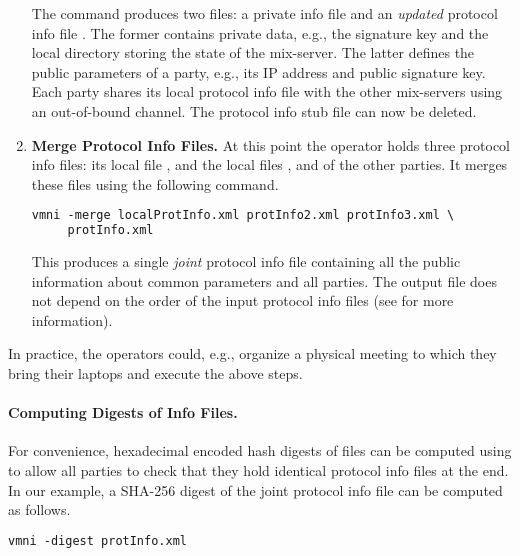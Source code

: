 \documentclass[11pt]{article}
\begin{document}
\begin{enumerate}
  The command produces two files: a private info file
   and an \emph{updated} protocol info file
  . The former contains private data, e.g., the
  signature key and the local directory storing the state of the
  mix-server. The latter defines the public parameters of a party, e.g.,
  its IP address and public signature key. Each party shares its local
  protocol info file with the other mix-servers using an out-of-bound
  channel. The protocol info stub file  can now be
  deleted.

\item\textbf{Merge Protocol Info Files.}  At this point the operator
  holds three protocol info files: its local file
  , and the local files ,
  and  of the other parties. It merges these files
  using the following command.

\vspace{0.3cm}
\begin{lstlisting}[frame=single,language=xml,
basicstyle=\tt,showstringspaces=false]
vmni -merge localProtInfo.xml protInfo2.xml protInfo3.xml \
     protInfo.xml
\end{lstlisting}

  This produces a single \emph{joint} protocol info file
   containing all the public information about common
  parameters and all parties. The output file does not depend on the
  order of the input protocol info files (see \sect{configure} for more
  information).

\end{enumerate}

\noindent
In practice, the operators could, e.g., organize a physical meeting to
which they bring their laptops and execute the above steps.


\paragraph{Computing Digests of Info Files.}

For convenience, hexadecimal encoded hash digests of files can be
computed using \vmni{} to allow all parties to check that they hold
identical protocol info files at the end. In our example, a SHA-256
digest of the joint protocol info file can be computed as follows.

\vspace{0.3cm}
\begin{lstlisting}[frame=single,language=xml,
basicstyle=\tt,showstringspaces=false]
vmni -digest protInfo.xml
\end{lstlisting}
\end{document}
